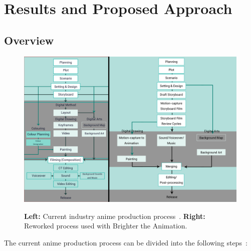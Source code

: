 \section{Results and Proposed Approach}

\subsection{Overview}

\begin{figure}[t]
    \centering
    \includegraphics[width=1\linewidth]{img/results/workflow.pdf} \\
    \caption{\textbf{Left:} Current industry anime production process~\cite{animeProcessAutodesk}. \textbf{Right:} Reworked process used with Brighter the Animation.}
    \vspace{-15pt}
    \label{fig:workflow}
\end{figure}

The current anime production process can be divided into the following steps~\cite{animeProcess, animeProcessAutodesk}:

